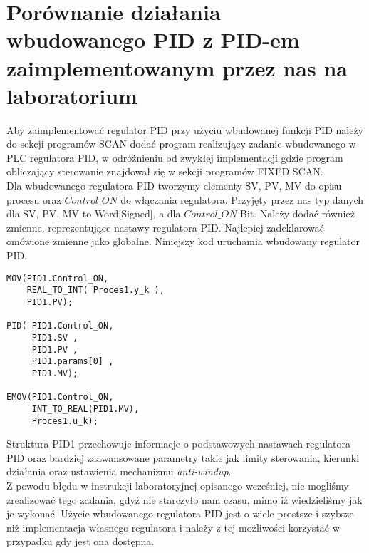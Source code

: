 \chapter{Porównanie działania wbudowanego PID z PID-em zaimplementowanym przez nas na laboratorium}
\label{pid_wbudowany}
Aby zaimplementować regulator PID przy użyciu wbudowanej funkcji PID należy 
do sekcji programów SCAN dodać program realizujący zadanie wbudowanego w PLC regulatora PID, w 
odróżnieniu od zwykłej implementacji gdzie program obliczający sterowanie znajdował się w sekcji programów 
FIXED SCAN. \\

Dla wbudowanego regulatora PID tworzymy elementy SV, PV, 
MV do opisu procesu oraz $Control\_ON$ do włączania regulatora. Przyjęty przez nas typ danych dla 
SV, PV, MV to Word[Signed], a dla $Control\_ON$ Bit. Należy dodać również zmienne, 
reprezentujące nastawy regulatora PID. Najlepiej zadeklarować omówione zmienne jako globalne. 
Niniejszy kod uruchamia wbudowany regulator PID.

\begin{lstlisting}[caption={Użycie wbudowanego regulatora PID}]
MOV(PID1.Control_ON, 
    REAL_TO_INT( Proces1.y_k ),
    PID1.PV);

PID( PID1.Control_ON, 
     PID1.SV , 
     PID1.PV , 
     PID1.params[0] , 
     PID1.MV);

EMOV(PID1.Control_ON, 
     INT_TO_REAL(PID1.MV), 
     Proces1.u_k);
\end{lstlisting}

Struktura PID1 przechowuje informacje o podstawowych nastawach regulatora PID oraz bardziej zaawansowane 
parametry takie jak limity sterowania, kierunki działania oraz ustawienia mechanizmu \textit{anti-windup}.\\

Z powodu błędu w instrukcji laboratoryjnej opisanego wcześniej, nie mogliśmy zrealizować tego zadania, gdyż 
nie starczyło nam czasu, mimo iż wiedzieliśmy jak je wykonać. 
Użycie wbudowanego regulatora PID jest o wiele prostsze i szybsze niż implementacja własnego regulatora
i należy z tej możliwości korzystać w przypadku gdy jest ona dostępna.


